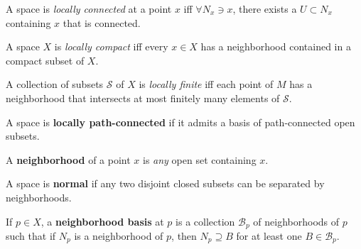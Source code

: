 \begin{definition}

A space is \emph{locally connected} at a point \(x\) iff
\(\forall N_{x} \ni x\), there exists a \(U\subset N_{x}\) containing
\(x\) that is connected.

\end{definition}

\begin{definition}

A space \(X\) is \emph{locally compact} iff every \(x\in X\) has a
neighborhood contained in a compact subset of \(X\).

\end{definition}

\begin{definition}

A collection of subsets \({\mathcal{S}}\) of \(X\) is \emph{locally
finite} iff each point of \(M\) has a neighborhood that intersects at
most finitely many elements of \({\mathcal{S}}\).

\end{definition}

\begin{definition}

A space is \textbf{locally path-connected} if it admits a basis of
path-connected open subsets.

\end{definition}

\begin{definition}[Neighborhood]

A \textbf{neighborhood} of a point \(x\) is \emph{any} open set
containing \(x\).

\end{definition}

\begin{definition}[Normal]

A space is \textbf{normal} if any two disjoint closed subsets can be
separated by neighborhoods.

\end{definition}

\begin{definition}

If \(p\in X\), a \textbf{neighborhood basis} at \(p\) is a collection
\({\mathcal{B}}_{p}\) of neighborhoods of \(p\) such that if \(N_{p}\)
is a neighborhood of \(p\), then \(N_{p} \supseteq B\) for at least one
\(B\in {\mathcal{B}}_{p}\).

\end{definition}

